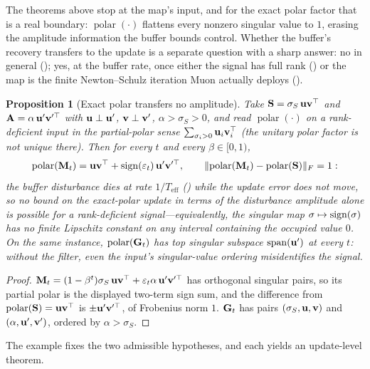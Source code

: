 \documentclass[11pt,a4paper]{article}
\newtheorem{proposition}{Proposition}
\theoremstyle{remark}
\newcommand{\Teff}{T_{\mathrm{eff}}}
\DeclareMathOperator{\polar}{polar}
\begin{document}
The theorems above stop at the map's input, and for the exact polar factor that is a real boundary: $\polar(\cdot)$ flattens every nonzero singular value to $1$, erasing the amplitude information the buffer bounds control.
Whether the buffer's recovery transfers to the update is a separate question with a sharp answer: no in general (); yes, at the buffer rate, once either the signal has full rank () or the map is the finite Newton--Schulz iteration Muon actually deploys ().

\begin{proposition}[Exact polar transfers no amplitude]
\label{prop:polaronly}
Take $\mathbf{S}=\sigma_S\,\mathbf{u}\mathbf{v}^\top$ and $\mathbf{A}=\alpha\,\mathbf{u}'\mathbf{v}'^\top$ with $\mathbf{u}\perp\mathbf{u}'$, $\mathbf{v}\perp\mathbf{v}'$, $\alpha>\sigma_S>0$, and read $\polar(\cdot)$ on a rank-deficient input in the partial-polar sense $\sum_{\sigma_i>0}\mathbf{u}_i\mathbf{v}_i^\top$ (the unitary polar factor is not unique there).
Then for every $t$ and every $\beta\in[0,1)$,
\[
\polar(\Mbf_t)=\ubf\vbf^\top+\sign(\varepsilon_t)\,\ubf'\vbf'^\top,
\qquad
\lVert\polar(\Mbf_t)-\polar(\Sbf)\rVert_F=1 :
\]
the buffer disturbance dies at rate $1/\Teff$ () while the update error does not move, so no bound on the exact-polar update in terms of the disturbance amplitude alone is possible for a rank-deficient signal---equivalently, the singular map $\sigma\mapsto\operatorname{\mathrm{sign}}(\sigma)$ has no finite Lipschitz constant on any interval containing the occupied value $0$.
On the same instance, $\polar(\Gbf_t)$ has top singular subspace $\mathrm{span}(\mathbf{u}')$ at every $t$: without the filter, even the input's singular-value ordering misidentifies the signal.
\end{proposition}

\begin{proof}
$\mathbf{M}_t=(1-\beta^t)\sigma_S\,\mathbf{u}\mathbf{v}^\top+\varepsilon_t\alpha\,\mathbf{u}'\mathbf{v}'^\top$ has orthogonal singular pairs, so its partial polar is the displayed two-term sign sum, and the difference from $\polar(\Sbf)=\ubf\vbf^\top$ is $\pm\mathbf{u}'\mathbf{v}'^\top$, of Frobenius norm $1$.
$\mathbf{G}_t$ has pairs $(\sigma_S,\mathbf{u},\mathbf{v})$ and $(\alpha,\mathbf{u}',\mathbf{v}')$, ordered by $\alpha>\sigma_S$.
\end{proof}

The example fixes the two admissible hypotheses, and each yields an update-level theorem.
\end{document}

